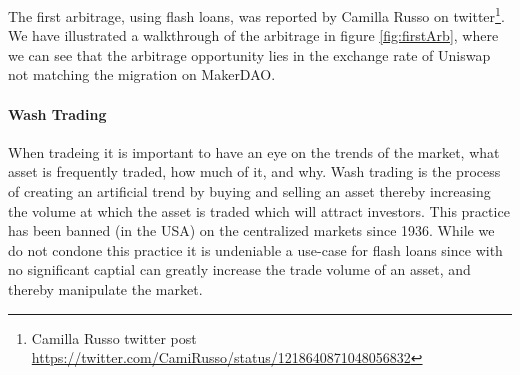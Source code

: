 The first arbitrage, using flash loans, was reported by Camilla Russo on twitter\footnote{Camilla Russo twitter post \url{https://twitter.com/CamiRusso/status/1218640871048056832}}. We have illustrated a walkthrough of the arbitrage in figure \ref{fig:firstArb}, where we can see that the arbitrage opportunity lies in the exchange rate of Uniswap not matching the migration on MakerDAO.

\paragraph{Wash Trading} When tradeing it is important to have an eye on the trends of the market, what asset is frequently traded, how much of it, and why. Wash trading is the process of creating an artificial trend by buying and selling an asset thereby increasing the volume at which the asset is traded which will attract investors. This practice has been banned (in the USA) on the centralized markets since 1936. While we do not condone this practice it is undeniable a use-case for flash loans since with no significant captial can greatly increase the trade volume of an asset, and thereby manipulate the market.